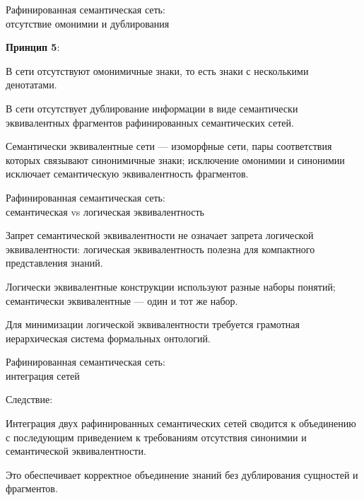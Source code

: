 \begin{frame}{Рафинированная семантическая сеть:\\отсутствие омонимии и дублирования}
	\topline
	\justifying
	
	\textbf{Принцип 5}:
	\begin{textitemize}
		\item В сети отсутствуют омонимичные знаки, то есть знаки с несколькими денотатами.
		\item В сети отсутствует дублирование информации в виде семантически эквивалентных фрагментов рафинированных семантических сетей.
	\end{textitemize}
	
	\medskip
	Семантически эквивалентные сети --- изоморфные сети, пары соответствия которых связывают синонимичные знаки; исключение омонимии и синонимии исключает семантическую эквивалентность фрагментов.
	
\end{frame}


\begin{frame}{Рафинированная семантическая сеть:\\семантическая vs логическая эквивалентность}
	\topline
	\justifying
	
	\begin{textitemize}
		\item Запрет семантической эквивалентности не означает запрета логической эквивалентности: логическая эквивалентность полезна для компактного представления знаний.
		\item Логически эквивалентные конструкции используют разные наборы понятий; семантически эквивалентные --- один и тот же набор.
		\item Для минимизации логической эквивалентности требуется грамотная иерархическая система формальных онтологий.
	\end{textitemize}
	
\end{frame}


\begin{frame}{Рафинированная семантическая сеть:\\интеграция сетей}
	\topline
	\justifying
	
	Следствие:
	\begin{textitemize}
		\item Интеграция двух рафинированных семантических сетей сводится к объединению с последующим приведением к требованиям отсутствия синонимии и семантической эквивалентности.
		\item Это обеспечивает корректное объединение знаний без дублирования сущностей и фрагментов.
	\end{textitemize}
	
\end{frame}


